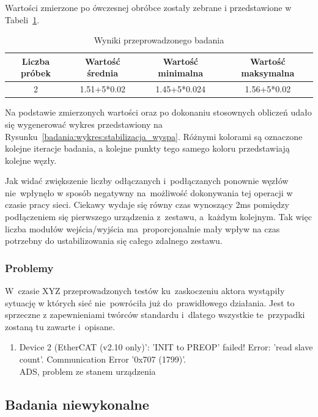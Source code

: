 Wartości zmierzone po ówczesnej obróbce zostały zebrane i przedstawione w Tabeli~\ref{badania:wyniki:stabilizacja_wyspa}.
\begin{table}[!htb]
\begin{center}
\begin{tabular}{| c | c | c | c |}\hline
\textbf{Liczba próbek} & \textbf{Wartość średnia} & \textbf{Wartość minimalna} & \textbf{Wartość maksymalna} \\\hline\hline
2 & 1.51+5*0.02 & 1.45+5*0.024 & 1.56+5*0.02 \\\hline
\end{tabular}
\end{center}
\vspace*{-6mm}
  \caption{Wyniki przeprowadzonego badania}
	\label{badania:wyniki:stabilizacja_wyspa}
\end{table}
Na podstawie zmierzonych wartości oraz po dokonaniu stosownych obliczeń udało się wygenerować wykres przedstawiony na Rysunku~\ref{badania:wykres:stabilizacja_wyspa}. Różnymi kolorami są oznaczone kolejne iteracje badania, a kolejne punkty tego samego koloru przedstawiają kolejne węzły.


Jak widać zwiększenie liczby odłączanych i~podłączanych ponownie węzłów nie~wpłynęło w sposób negatywny na~możliwość dokonywania tej operacji w czasie pracy sieci. Ciekawy wydaje się równy czas wynoszący 2ms pomiędzy podłączeniem się pierwszego urządzenia z~zestawu, a~każdym kolejnym. Tak więc liczba modułów wejścia/wyjścia ma~proporcjonalnie mały wpływ na czas potrzebny do ustabilizowania się całego zdalnego zestawu.

\subsubsection{Problemy}
W~czasie XYZ przeprowadzonych testów ku~zaskoczeniu aktora wystąpiły sytuację w których sieć nie~powróciła już do~prawidłowego działania. Jest to sprzeczne z zapewnieniami twórców standardu i~dlatego wszystkie te~przypadki zostaną tu zawarte i~opisane.

\begin{enumerate}
\item Device 2 (EtherCAT (v2.10 only)': 'INIT to PREOP' failed! Error: 'read slave count'. Communication Error '0x707 (1799)'. \\[1mm]
ADS, problem ze stanem urządzenia
\end{enumerate}

\subsection{Badania niewykonalne}

